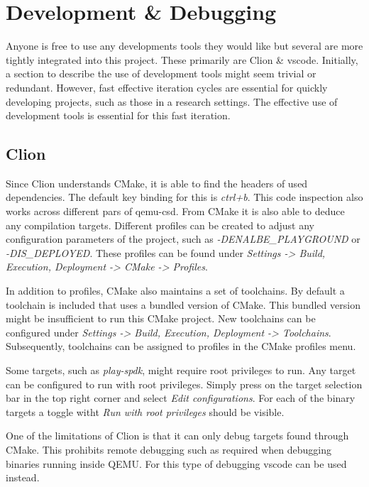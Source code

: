 \documentclass[conference]{IEEEtran}
\begin{document}
\section{Development \& Debugging}

Anyone is free to use any developments tools they would like but several are
more tightly integrated into this project. These primarily are Clion \& vscode.
Initially, a section to describe the use of development tools might seem trivial
or redundant. However, fast effective iteration cycles are essential for quickly
developing projects, such as those in a research settings. The effective use of
development tools is essential for this fast iteration.

\subsection{Clion}

Since Clion understands CMake, it is able to find the headers of used
dependencies. The default key binding for this is \textit{ctrl+b}. This code
inspection also works across different pars of qemu-csd. From CMake it is also
able to deduce any compilation targets. Different profiles can be created to
adjust any configuration parameters of the project, such as
\textit{-DENALBE\_PLAYGROUND} or \textit{-DIS\_DEPLOYED}. These profiles can be
found  under \textit{Settings -> Build, Execution, Deployment -> CMake -> Profiles}.

In addition to profiles, CMake also maintains a set of toolchains. By default
a toolchain is included that uses a bundled version of CMake. This bundled
version might be insufficient to run this CMake project. New toolchains can be
configured under \textit{Settings -> Build, Execution, Deployment -> Toolchains}.
Subsequently, toolchains can be assigned to profiles in the CMake profiles menu.

Some targets, such as \textit{play-spdk}, might require root privileges to run.
Any target can be configured to run with root privileges. Simply press on the
target selection bar in the top right corner and select
\textit{Edit configurations}. For each of the binary targets a toggle witht
\textit{Run with root privileges} should be visible.

One of the limitations of Clion is that it can only debug targets found through
CMake. This prohibits remote debugging such as required when debugging binaries
running inside QEMU. For this type of debugging vscode can be used instead.
\end{document}
